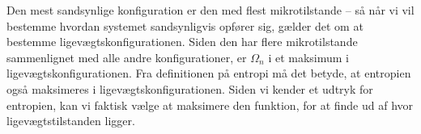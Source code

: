 \noindent Den mest sandsynlige konfiguration er den med flest mikrotilstande -- så når vi vil bestemme hvordan systemet sandsynligvis opfører sig, gælder det om at bestemme ligevægtskonfigurationen. %
Siden den har flere mikrotilstande sammenlignet med alle andre konfigurationer, er $\Omega_n$ i et maksimum i ligevægtskonfigurationen. Fra definitionen på entropi må det betyde, at entropien også maksimeres i ligevægtskonfigurationen. Siden vi kender et udtryk for entropien, kan vi faktisk vælge at maksimere den funktion, for at finde ud af hvor ligevægtstilstanden ligger.

